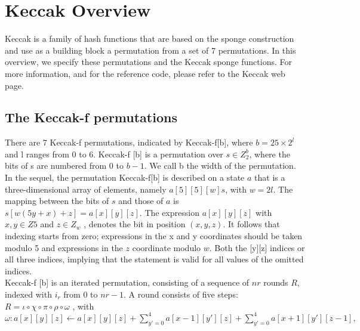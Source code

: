 \chapter{Keccak Overview} \label{chap:keccak-overview} 
Keccak is a family of hash functions that are based on the sponge construction and use as a building block a permutation from a set of 7 permutations.
In this overview, we specify these permutations and the Keccak sponge functions. For more information, and for the reference code, please refer to the Keccak web page.

\section{The Keccak-f permutations}
There are 7 Keccak-f permutations, indicated by Keccak-f[b], where \({b = 25 \times 2^l}\) and
l ranges from 0 to 6. Keccak-f [b] is a permutation over \({s \in Z^b_2}\), where the bits of s are 
numbered from 0 to \({b − 1}\). We call b the width of the permutation.\\

In the sequel, the permutation Keccak-f[b] is described on a state \({a}\) that is a three-dimensional array of elements, namely \({a[5][5][w]}s\), 
with \({w = 2l}\). The mapping between the bits of \({s}\) and those of \({a}\) is \({s[w(5y + x) + z] = a[x][y][z]}\). The expression \({a[x][y][z]}\) with
\({x, y \in Z5}\) and \({z \in Z_w}\) , denotes the bit in position \({(x, y, z)}\). It follows that indexing starts from
zero; expressions in the x and y coordinates should be taken modulo 5 and expressions in the
\({z}\) coordinate modulo \({w}\). Both the [y][z] indices or all
three indices, implying that the statement is valid for all values of the omitted indices.\\

Keccak-f [b] is an iterated permutation, consisting of a sequence of \({nr}\) rounds \({R}\), indexed
with \({i_r}\) from 0 to \({nr − 1}\). A round consists of five steps:\\


	$R = \iota \circ \chi \circ \pi \circ \rho \circ \omega$ ,   with \\


\({	\omega : a[x][y][z] \leftarrow a[x][y][z] + \sum_{y'=0}^4 a[x − 1][y'][z] + \sum_{y'=0}^4 a[x + 1][y ′ ][z − 1] ,} \)\\

